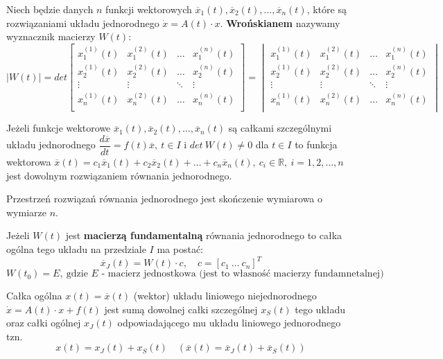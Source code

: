 \begin{df}
Niech będzie danych $n$ funkcji wektorowych $\overline{x}_1(t),\overline{x}_2(t),\ldots,\overline{x}_n(t)$, które są rozwiązaniami układu jednorodnego $\dot{x}=A(t)\cdot x$. \textbf{Wrońskianem} nazywamy wyznacznik macierzy $W(t)$:
$$|W(t)|=det
\begin{bmatrix}
x_1^{(1)}(t) & x_1^{(2)}(t) & \ldots & x_1^{(n)}(t)\\
x_2^{(1)}(t) & x_2^{(2)}(t) & \ldots & x_2^{(n)}(t)\\
\vdots & \vdots & \ddots & \vdots\\
x_n^{(1)}(t) & x_n^{(2)}(t) & \ldots & x_n^{(n)}(t)\\
\end{bmatrix}=
\begin{vmatrix}
x_1^{(1)}(t) & x_1^{(2)}(t) & \ldots & x_1^{(n)}(t)\\
x_2^{(1)}(t) & x_2^{(2)}(t) & \ldots & x_2^{(n)}(t)\\
\vdots & \vdots & \ddots & \vdots\\
x_n^{(1)}(t) & x_n^{(2)}(t) & \ldots & x_n^{(n)}(t)\\
\end{vmatrix}$$
\end{df}

\begin{tw}
Jeżeli funkcje wektorowe $\overline{x}_1(t),\overline{x}_2(t),\ldots,\overline{x}_n(t)$ są całkami szczególnymi układu jednorodnego $\dfrac{d\overline{x}}{dt}=f(t)\overline{x},\ t\in I$ i $det\ W(t)\neq 0$ dla $t\in I$ to funkcja wektorowa $\overline{x}(t)=c_1\overline{x}_1(t)+c_2\overline{x}_2(t)+\ldots+c_n\overline{x}_n(t),\ c_i\in\mathbb{R},\ i=1,2,\ldots,n$ jest dowolnym rozwiązaniem równania jednorodnego.
\end{tw}

\begin{tw}
Przestrzeń rozwiązań równania jednorodnego jest skończenie wymiarowa o wymiarze $n$.
\end{tw}

\begin{tw}
Jeżeli $W(t)$ jest \textbf{macierzą fundamentalną} równania jednorodnego to całka ogólna tego układu na przedziale $I$ ma postać: $$\overline{x}_J(t)=W(t)\cdot c,\quad c=[c_1\ \ldots\ c_n]^T$$ $$W(t_0)=E,\ \textrm{gdzie }E\textrm{ - macierz jednostkowa (jest to własność macierzy fundamnetalnej)}$$
\end{tw}

\begin{tw}
Całka ogólna $x(t)=\overline{x}(t)$ (wektor) układu liniowego niejednorodnego $\dot{x}=A(t)\cdot x+f(t)$ jest sumą dowolnej całki szczególnej $x_S(t)$ tego układu oraz całki ogólnej $x_J(t)$ odpowiadającego mu układu liniowego jednorodnego tzn. $$x(t)=x_J(t)+x_S(t)\quad (\overline{x}(t)=\overline{x}_J(t)+\overline{x}_S(t))$$
\end{tw}

